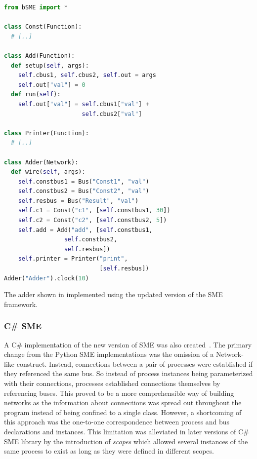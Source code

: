 \begin{widefigure}
  \begin{multicols}{2}
    \small
\begin{lstlisting}[language=python]
from bSME import *

class Const(Function):
  # [..]

class Add(Function):
  def setup(self, args):
    self.cbus1, self.cbus2, self.out = args
    self.out["val"] = 0
  def run(self):
    self.out["val"] = self.cbus1["val"] +
                      self.cbus2["val"]

class Printer(Function):
  # [..]

class Adder(Network):
  def wire(self, args):
    self.constbus1 = Bus("Const1", "val")
    self.constbus2 = Bus("Const2", "val")
    self.resbus = Bus("Result", "val")
    self.c1 = Const("c1", [self.constbus1, 30])
    self.c2 = Const("c2", [self.constbus2, 5])
    self.add = Add("add", [self.constbus1,
                 self.constbus2,
                 self.resbus])
    self.printer = Printer("print",
                           [self.resbus])
Adder("Adder").clock(10)
\end{lstlisting}
  \end{multicols}
\caption{The adder shown in  implemented using the updated
  version of the SME framework.}
\label{fig:adder2}
\end{widefigure}

\subsubsection{C\# SME}
A C\# implementation of the new version of SME was also
created~\cite{skovhede2016building}. The primary change from the Python SME
implementations was the omission of a {\ttfamily Network}-like
construct. Instead, connections between a pair of processes were established if
they referenced the same bus. So instead of process instances being
parameterized with their connections, processes established connections
themselves by referencing buses. This proved to be a more comprehensible way of
building networks as the information about connections was spread out throughout
the program instead of being confined to a single class.  However, a shortcoming
of this approach was the one-to-one correspondence between process and bus
declarations and instances. This limitation was alleviated in later versions of
C\# SME library by the introduction of {\itshape scopes} which allowed several
instances of the same process to exist as long as they were defined in different
scopes.

